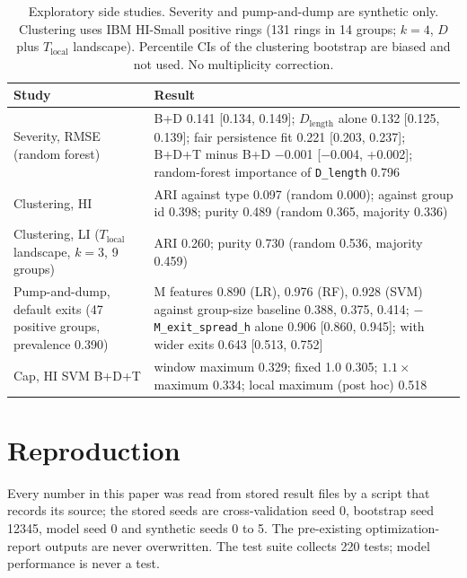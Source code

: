 \documentclass[conference]{IEEEtran}
\newcommand{\mi}{\ensuremath{-}}
\begin{document}
\begin{table}[!t]
\caption{Exploratory side studies. Severity and pump-and-dump are synthetic only. Clustering uses IBM HI-Small positive rings (131 rings in 14 groups; $k=4$, $D$ plus $T_{\mathrm{local}}$ landscape). Percentile CIs of the clustering bootstrap are biased and not used. No multiplicity correction.}
\label{tab:expl}
\centering
\footnotesize
\setlength{\tabcolsep}{3pt}
\begin{tabular}{@{}p{}p{}@{}}
\toprule
Study & Result \\
\midrule
Severity, RMSE (random forest) & B+D 0.141 [0.134, 0.149]; $D_{\mathrm{length}}$ alone 0.132 [0.125, 0.139]; fair persistence fit 0.221 [0.203, 0.237]; B+D+T minus B+D $\mi$0.001 [$\mi$0.004, +0.002]; random-forest importance of \texttt{D\_length} 0.796 \\
Clustering, HI & ARI against type 0.097 (random 0.000); against group id 0.398; purity 0.489 (random 0.365, majority 0.336) \\
Clustering, LI ($T_{\mathrm{local}}$ landscape, $k=3$, 9 groups) & ARI 0.260; purity 0.730 (random 0.536, majority 0.459) \\
Pump-and-dump, default exits (47 positive groups, prevalence 0.390) & M features 0.890 (LR), 0.976 (RF), 0.928 (SVM) against group-size baseline 0.388, 0.375, 0.414; \texttt{\mi M\_exit\_spread\_h} alone 0.906 [0.860, 0.945]; with wider exits 0.643 [0.513, 0.752] \\
Cap, HI SVM B+D+T & window maximum 0.329; fixed 1.0 0.305; $1.1\times$ maximum 0.334; local maximum (post hoc) 0.518 \\
\bottomrule
\end{tabular}
\end{table}

\section{Reproduction}
Every number in this paper was read from stored result files by a script that records its source; the stored seeds are cross-validation seed 0, bootstrap seed 12345, model seed 0 and synthetic seeds 0 to 5. The pre-existing optimization-report outputs are never overwritten. The test suite collects 220 tests; model performance is never a test.



\end{document}
